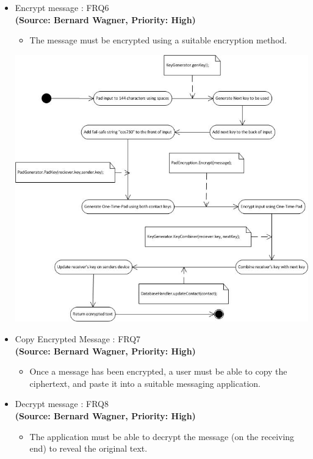 \begin{itemize}
\item{Encrypt message : FRQ6}\\
\textbf{(Source: Bernard Wagner, Priority: High)}
\begin{itemize}
\item The message must be encrypted using a suitable encryption method.
\end{itemize}
 \includegraphics[width=13cm]{diagrams/StateDiagrams/EncryptMessageStateDiagram.png}
\item{Copy Encrypted Message : FRQ7}\\
\textbf{(Source: Bernard Wagner, Priority: High)}
\begin{itemize}
\item Once a message has been encrypted, a user must be able to copy the ciphertext, and paste it into a suitable messaging application.
\end{itemize}
\item{Decrypt message : FRQ8}\\
\textbf{(Source: Bernard Wagner, Priority: High)}
\begin{itemize}
\item The application must be able to decrypt the message (on the receiving end) to reveal the original text.
\end{itemize}

\end{itemize}

